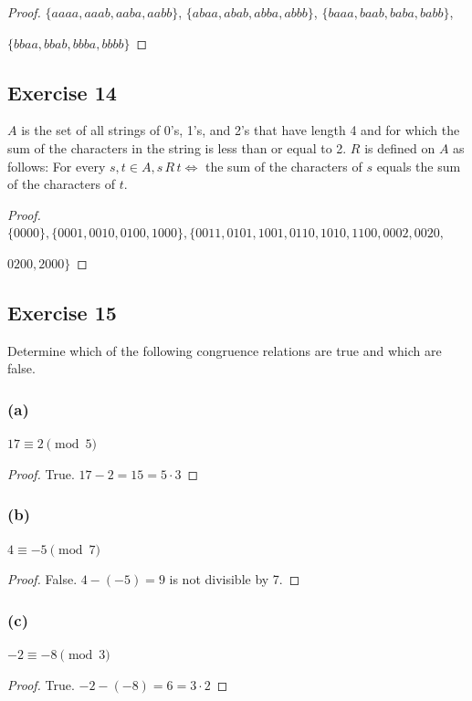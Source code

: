 \documentclass[14pt]{extarticle}
\begin{document}
\begin{proof}
\(\{aaaa, aaab, aaba, aabb\}\), \(\{abaa, abab, abba, abbb\}\), \(\{baaa, baab, baba, babb\}\), 

\(\{bbaa, bbab, bbba, bbbb\}\)
\end{proof}

\subsection{Exercise 14}
\(A\) is the set of all strings of 0’s, 1’s, and 2’s that have length 4 and for which the sum of the characters in 
the string is less than or equal to 2. \(R\) is defined on \(A\) as follows: For every \(s, t \in A, s \,R\, t \iff\) 
the sum of the characters of \(s\) equals the sum of the characters of \(t\).

\begin{proof}
\(\{0000\}, \{0001, 0010, 0100, 1000\}, \{0011, 0101, 1001, 0110, 1010, 1100, 0002, 0020,\)

\(0200, 2000\}\)
\end{proof}

\subsection{Exercise 15}
Determine which of the following congruence relations are true and which are false.

\subsubsection{(a)}
\(17 \equiv 2 \pmod 5\)
\begin{proof}
True. \(17 - 2 = 15 = 5 \cdot 3\)
\end{proof}

\subsubsection{(b)}
\(4 \equiv -5 \pmod 7\)
\begin{proof}
False. \(4 - (-5) = 9\) is not divisible by 7.
\end{proof}

\subsubsection{(c)}
\(-2 \equiv -8 \pmod 3\)
\begin{proof}
True. \(-2 - (-8) = 6 = 3 \cdot 2\)
\end{proof}
\end{document}

